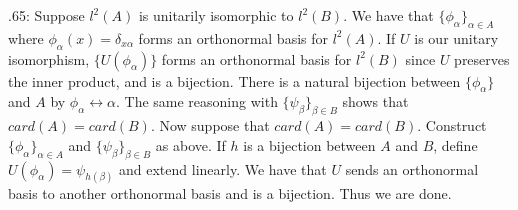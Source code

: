 \documentclass[letterpaper]{article}
\begin{document}
 .65: Suppose $l^2(A)$ is unitarily isomorphic to $l^2(B).$ 
We have that $\{\phi_\alpha\}_{\alpha \in A}$ where $\phi_\alpha(x) = \delta_{x \alpha} $ forms an orthonormal basis for $l^2(A)$. 
If $U$ is our unitary isomorphism, $\{U(\phi_\alpha)\}$ forms an orthonormal basis for $l^2(B)$ since $U$ preserves the inner product, and is a bijection.
There is a natural bijection between $\{\phi_\alpha\}$ and $A$ by $\phi_\alpha \leftrightarrow \alpha$. The same reasoning with $\{\psi_\beta\}_{\beta \in B}$ 
shows that $card(A) = card(B)$. Now suppose that $card(A) = card(B)$. Construct $\{\phi_\alpha\}_{\alpha \in A}$ and $\{\psi_\beta\}_{\beta \in B}$ as above. 
If $h$ is a bijection between $A$ and $B$, define $U(\phi_\alpha)= \psi_{h(\beta)}$ and extend linearly. 
We have that $U$ sends an orthonormal basis to another orthonormal basis and is a bijection. Thus we are done. 
\end{document}
